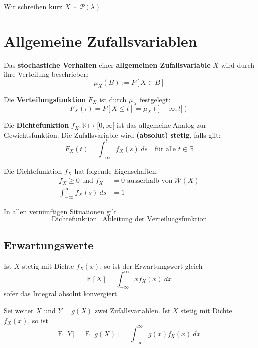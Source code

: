 \documentclass[11pt]{article}
\newcommand{\E}{\text{E}}
\begin{document}
Wir schreiben kurz $X \sim \mathcal{P}(\lambda)$

\section{Allgemeine Zufallsvariablen}

Das \textbf{stochastiche Verhalten} einer \textbf{allgemeinen Zufallsvariable} $X$ wird durch ihre Verteilung beschrieben:
\begin{equation*}
	\mu_X(B) := P[X \in B] 
\end{equation*}

Die \textbf{Verteilungsfunktion $F_X$} ist durch $\mu_X$ festgelegt:
\begin{equation*}
	F_X(t) = P[X \leq t] = \mu_X(]-\infty,t])
\end{equation*}

Die \textbf{Dichtefunktion} $f_X: \mathbb{R} \mapsto [0,\infty[$ ist das allgemeine Analog zur Gewichtsfunktion. Die Zufallsvariable wird \textbf{(absolut) stetig}, falls gilt:
\begin{equation*}
	F_X(t) = \int_{-\infty}^t f_X(s)\ ds \quad\text{für alle }t\in \mathbb{R}
\end{equation*}

Die Dichtefunktion $f_X$ hat folgende Eigenschaften:
\begin{equation*}
\begin{split}
	f_X \geq 0 \text{ und } f_X & = 0\text{ ausserhalb von } \mathcal{W}(X) \\
	\int_{-\infty}^\infty f_X(s)\ ds & = 1
\end{split}
\end{equation*}

In allen vernünftigen Situationen gilt
\begin{equation*}
	\text{Dichtefunktion} = \text{Ableitung der Verteilungsfunktion}
\end{equation*}

\subsection{Erwartungswerte}

Ist $X$ stetig mit Dichte $f_X(x)$, so ist der Erwartungswert gleich
\begin{equation*}
	\E[X] = \int_{-\infty}^\infty x f_X(x)\ dx
\end{equation*}
sofer das Integral absolut konvergiert.

Sei weiter $X$ und $Y = g(X)$ zwei Zufallsvariablen. Ist $X$ stetig mit Dichte $f_X(x)$, so ist
\begin{equation*}
	\E[Y] = \E[g(X)] = \int_{-\infty}^\infty g(x)f_X(x)\ dx
\end{equation*} 
\end{document}
